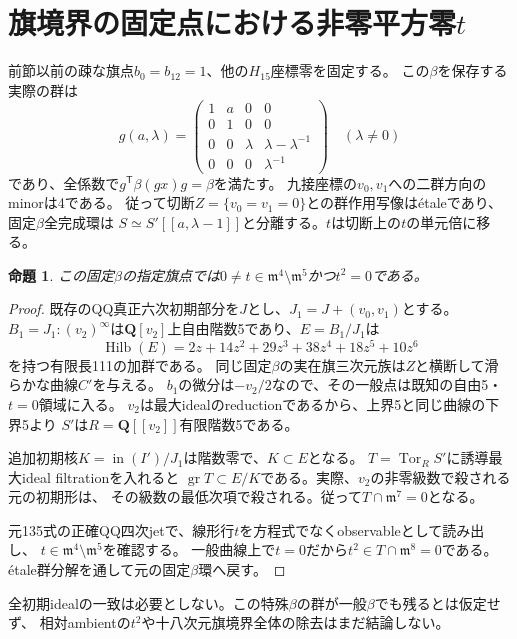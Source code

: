 \documentclass[11pt,a4paper]{ltjsarticle}
\newcommand{\QQ}{\mathbf Q}
\newtheorem{proposition}[theorem]{命題}
\theoremstyle{remark}
\begin{document}
\section{旗境界の固定点における非零平方零$t$}
前節以前の疎な旗点$b_0=b_{12}=1$、他の$H_{15}$座標零を固定する。
この$\beta$を保存する実際の群は
\[
 g(a,\lambda)=
 \begin{pmatrix}1&a&0&0\\0&1&0&0\\0&0&\lambda&\lambda-\lambda^{-1}\\0&0&0&\lambda^{-1}\end{pmatrix}
 \quad(\lambda\ne0)
\]
であり、全係数で$g^{\mathsf T}\beta(gx)g=\beta$を満たす。
九接座標の$v_0,v_1$への二群方向のminorは4である。
従って切断$Z=\{v_0=v_1=0\}$との群作用写像はétaleであり、固定$\beta$全完成環は
$S\simeq S'[[a,\lambda-1]]$と分離する。$t$は切断上の$t$の単元倍に移る。

\begin{proposition}
この固定$\beta$の指定旗点では$0\ne t\in\mathfrak m^4\setminus\mathfrak m^5$かつ$t^2=0$である。
\end{proposition}
\begin{proof}
既存のQQ真正六次初期部分を$J$とし、$J_1=J+(v_0,v_1)$とする。
$B_1=J_1:(v_2)^\infty$は$\QQ[v_2]$上自由階数5であり、$E=B_1/J_1$は
\[
 \operatorname{Hilb}(E)=2z+14z^2+29z^3+38z^4+18z^5+10z^6
\]
を持つ有限長111の加群である。
同じ固定$\beta$の実在旗三次元族は$Z$と横断して滑らかな曲線$C'$を与える。
$b_1$の微分は$-v_2/2$なので、その一般点は既知の自由5・$t=0$領域に入る。
$v_2$は最大idealのreductionであるから、上界5と同じ曲線の下界5より
$S'$は$R=\QQ[[v_2]]$有限階数5である。

追加初期核$K=\operatorname{in}(I')/J_1$は階数零で、$K\subset E$となる。
$T=\operatorname{Tor}_R S'$に誘導最大ideal filtrationを入れると
$\operatorname{gr}T\subset E/K$である。実際、$v_2$の非零級数で殺される元の初期形は、
その級数の最低次項で殺される。従って$T\cap\mathfrak m^7=0$となる。

元135式の正確QQ四次jetで、線形行$t$を方程式でなくobservableとして読み出し、
$t\in\mathfrak m^4\setminus\mathfrak m^5$を確認する。
一般曲線上で$t=0$だから$t^2\in T\cap\mathfrak m^8=0$である。
étale群分解を通して元の固定$\beta$環へ戻す\cite{flag-split-v45}。
\end{proof}
全初期idealの一致は必要としない。この特殊$\beta$の群が一般$\beta$でも残るとは仮定せず、
相対ambientの$t^2$や十八次元旗境界全体の除去はまだ結論しない。
\end{document}
